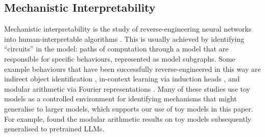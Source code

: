 
\subsection*{Mechanistic Interpretability}
Mechanistic interpretability is the study of reverse-engineering neural networks 
into human-interpretable algorithms \citep{olah2020zoom, 
ferrando2024primer, nanda2023progress}. This is usually achieved by identifying ``circuits'' in the model: paths of computation through a model that are responsible for specific behaviours, represented as model subgraphs.
Some example behaviours that have been successfully reverse-engineered in this way are indirect object identification \citep{wang2022interpretability}, in-context learning via induction heads \citep{olsson2022context}, and modular arithmetic via Fourier representations \citep{nanda2023progress}. 
Many of these studies use toy models as a controlled environment for identifying mechanisms that might generalise to larger models, which supports our use of toy models in this paper. For example, \citet{baeumel2025modular} found the modular arithmetic results on toy models subsequently generalised to pretrained LLMs.

